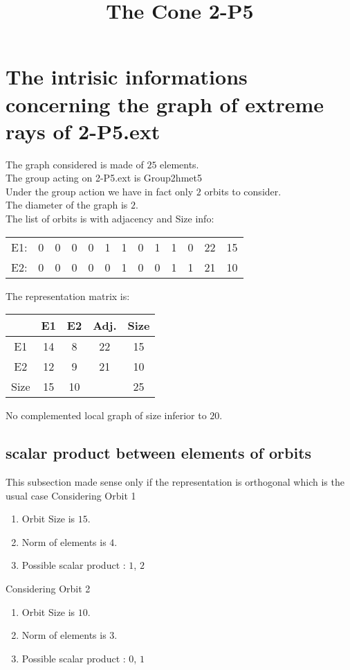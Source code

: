 \documentclass[12pt]{article}
\title{The Cone 2-P5}
\begin{document}
\maketitle
\section{The intrisic informations concerning the graph of extreme rays of 2-P5.ext}
The graph considered is made of $25$ elements.\\
The group acting on 2-P5.ext is Group2hmet5\\
Under the group action we have in fact only $2$ orbits to consider.\\
The diameter of the graph is $2$.\\
The list of orbits is with adjacency and Size info:
\begin{center}
\scriptsize
\begin{tabular}{ccccccccccc|c|c}
E1:&0&0&0&0&1&1&0&1&1&0&22&15\\
E2:&0&0&0&0&0&1&0&0&1&1&21&10\\
\end{tabular}
\end{center}
The representation matrix is:
\begin{center}
\scriptsize
\begin{tabular}{|c|cc|c|c|}
\hline
&E1&E2&Adj.&Size\\
\hline
E1& 14& 8&22&15\\
E2& 12& 9&21&10\\
\hline
Size&15&10&&25\\
\hline
\end{tabular}
\end{center}
No complemented local graph of size inferior to $20$.
\subsection{scalar product between elements of orbits}
\noindent This subsection made sense only if the representation is orthogonal which is the usual case
Considering Orbit 1
\begin{enumerate}
\item Orbit Size is $15$.
\item Norm of elements is $4$.
\item Possible scalar product : $1$, $2$
\end{enumerate}
Considering Orbit 2
\begin{enumerate}
\item Orbit Size is $10$.
\item Norm of elements is $3$.
\item Possible scalar product : $0$, $1$
\end{enumerate}
\end{document}
